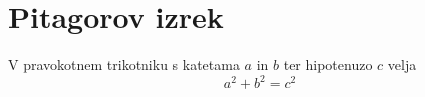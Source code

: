 \documentclass{article}
\begin{document}
\section*{Pitagorov izrek}
V pravokotnem trikotniku s katetama $a$ in $b$ ter hipotenuzo $c$ velja
$$ a^2 + b^2 = c^2 $$
\end{document}
